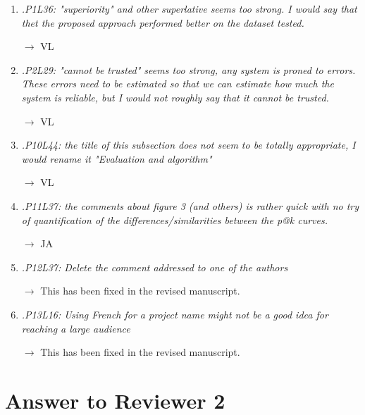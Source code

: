 \documentclass[10pt]{article}
\begin{document}
\begin{enumerate}
\item \emph{.P1L36: "superiority" and other superlative seems too strong. I would say that thet the proposed approach performed better on the dataset tested.}

$\rightarrow$ VL

\item \emph{.P2L29: "cannot be trusted" seems too strong, any system is proned to errors. These errors need to be estimated so that we can estimate how much the system is reliable, but I would not roughly say that it cannot be trusted.}

$\rightarrow$ VL

\item \emph{.P10L44: the title of this subsection does not seem to be totally appropriate, I would rename it "Evaluation and algorithm"}

$\rightarrow$ VL

\item \emph{.P11L37: the comments about figure 3 (and others) is rather quick with no try of quantification of the differences/similarities between the p@k curves.}

$\rightarrow$ JA

\item \emph{.P12L37: Delete the comment addressed to one of the authors}

$\rightarrow$
This has been fixed in the revised manuscript.

\item \emph{.P13L16: Using French for a project name might not be a good idea for reaching a large audience}

$\rightarrow$
This has been fixed in the revised manuscript.

\end{enumerate}

\section{Answer to Reviewer 2}
\end{document}
